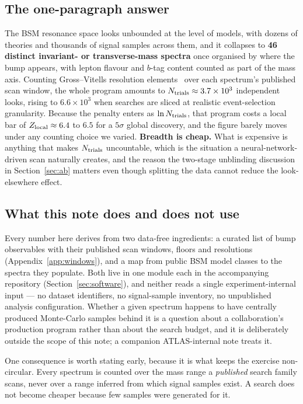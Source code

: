 \subsection{The one-paragraph answer}

The BSM resonance space looks unbounded at the level of models, with dozens of theories and
thousands of signal samples across them, and it collapses to \textbf{46 distinct invariant- or
transverse-mass spectra} once organised by where the bump appears, with lepton flavour and
$b$-tag content counted as part of the mass axis. Counting Gross--Vitells
resolution elements~\cite{grossvitells} over each spectrum's published scan window, the whole
program amounts to $N_{\mathrm{trials}} \approx 3.7\times10^{3}$ independent looks, rising to $6.6\times10^{3}$
when searches are sliced at realistic event-selection granularity. Because the penalty enters as
$\ln N_{\mathrm{trials}}$, that program costs a local bar of $Z_{\mathrm{local}} \approx 6.4$ to $6.5$ for a $5\sigma$ global
discovery, and the figure barely moves under any counting choice we varied. \textbf{Breadth is
cheap.} What is expensive is anything that makes $N_{\mathrm{trials}}$ uncountable, which is the situation a
neural-network-driven scan naturally creates, and the reason the two-stage unblinding discussion
in Section~\ref{sec:ab} matters even though splitting the data cannot reduce the look-elsewhere
effect.

\subsection{What this note does and does not use}

Every number here derives from two data-free ingredients: a curated list of bump observables with
their published scan windows, floors and resolutions (Appendix~\ref{app:windows}), and a map from
public BSM model classes to the spectra they populate. Both live in one module each in the
accompanying repository (Section~\ref{sec:software}), and neither reads a single experiment-internal
input --- no dataset identifiers, no signal-sample inventory, no unpublished analysis
configuration. Whether a given spectrum happens to have centrally produced Monte-Carlo samples
behind it is a question about a collaboration's production program rather than about the search
budget, and it is deliberately outside the scope of this note; a companion ATLAS-internal note
treats it.

One consequence is worth stating early, because it is what keeps the exercise
non-circular. Every spectrum is counted over the mass range a \emph{published} search family
scans, never over a range inferred from which signal samples exist. A search does not become
cheaper because few samples were generated for it.

